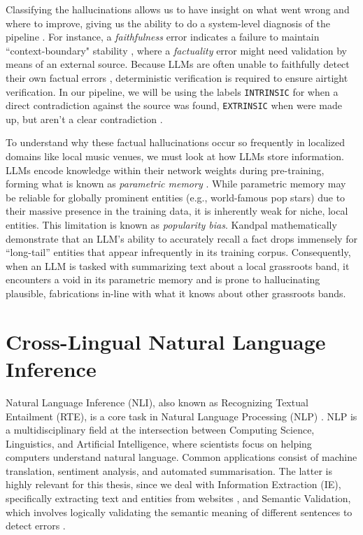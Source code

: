\noindent Classifying the hallucinations allows us to have insight on what went wrong and where to improve, giving us the ability to do a system-level
diagnosis of the pipeline \cite{vinay2025failuremodesllmsystems}. For instance, a \textit{faithfulness} error indicates a failure to maintain ``context-boundary" stability \cite{vinay2025failuremodesllmsystems}, 
where a \textit{factuality} error might need validation by means of an external source. Because LLMs are often unable to faithfully detect their own factual errors 
  \cite{chen2023felm}, deterministic verification is required to ensure airtight verification. In our pipeline, we will be using the labels \texttt{INTRINSIC} for when a direct contradiction against the source was found, \texttt{EXTRINSIC} when were made up, but aren't a clear contradiction \cite{huang2025survey}. 

To understand why these factual hallucinations occur so frequently in localized domains like local music venues, we must look at how LLMs store information. LLMs encode knowledge within their network weights during pre-training, forming what is known as \textit{parametric memory} \cite{mallen2023when}. While parametric memory may be reliable for globally prominent entities (e.g., world-famous pop stars) due to their massive presence in the training data, it is inherently weak for niche, local entities. This limitation is known as \textit{popularity bias}. Kandpal \etal \cite{kandpal2023longtail} mathematically demonstrate that an LLM's ability to accurately recall a fact drops immensely for ``long-tail'' entities that appear infrequently in its training corpus. Consequently, when an LLM is tasked with summarizing text about a local grassroots band, it encounters a void in its parametric memory and is prone to hallucinating plausible, fabrications in-line with what it knows about other grassroots bands. 


\section{Cross-Lingual Natural Language Inference}\label{pre:sec:nli}
Natural Language Inference (NLI), also known as Recognizing Textual Entailment (RTE), 
is a core task in Natural Language Processing (NLP) \cite{conneau2020unsupervised}. 
NLP is a multidisciplinary field at the intersection between Computing Science, Linguistics, and Artificial Intelligence, where scientists focus on 
helping computers understand natural language. Common applications consist of machine translation, 
sentiment analysis, and automated summarisation. The latter is 
highly relevant for this thesis, since we deal with Information Extraction (IE), specifically
 extracting text and entities from websites \cite{gao2024empirical}, and Semantic Validation, 
 which involves logically validating the semantic meaning of different sentences to detect errors \cite{huang2025survey, chen2023felm}.

